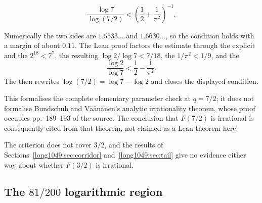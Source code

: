 \documentclass[11pt]{article}
\begin{document}
\begin{theorem}\label{long1049:res:sevenhalves}
\[
 \frac{\log 7}{\log(7/2)}
 <
 \left(\frac12+\frac1{\pi^2}\right)^{-1}.
\]
\end{theorem}

\noindent Numerically the two sides are $1.5533\ldots$ and $1.6630\ldots$, so
the condition holds with a margin of about $0.11$.  The Lean proof factors the
estimate through the explicit
 and the
 $2^{18}<7^7$, the resulting
 $\log2/\log7<7/18$, the
$1/\pi^2<1/9$, and the
\[
 \frac{\log2}{\log7}<\frac12-\frac1{\pi^2}.
\]
The
 then rewrites
$\log(7/2)=\log7-\log2$ and closes the displayed condition.

This formalises the complete elementary parameter check at $q=7/2$; it does
not formalise Bundschuh and V\"a\"an\"anen's analytic irrationality theorem,
whose proof occupies pp.~189--193 of the source.  The conclusion that
$F(7/2)$ is irrational is consequently cited from that theorem, not claimed as
a Lean theorem here.

The criterion does not cover $3/2$, and the results of
Sections~\ref{long1049:sec:corridor} and~\ref{long1049:sec:tail} give no evidence either way
about whether $F(3/2)$ is irrational.

\subsection{The $81/200$ logarithmic region}
\end{document}
